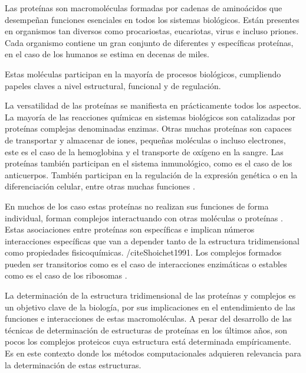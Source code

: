 Las proteínas son macromoléculas formadas por cadenas de aminoácidos que desempeñan funciones esenciales en todos los sistemas biológicos. Están presentes en organismos tan diversos como procariostas, eucariotas, virus e incluso priones. Cada organismo contiene un gran conjunto de diferentes y específicas proteínas, en el caso de los humanos se estima en decenas de miles.\cite{Cozzone2010}

Estas moléculas participan en la mayoría de procesos biológicos, cumpliendo papeles claves a nivel estructural, funcional y de regulación. \cite{Ritchie2008}

La versatilidad de las proteínas se manifiesta en prácticamente todos los aspectos. La mayoría de las reacciones químicas en sistemas biológicos son catalizadas por proteínas complejas denominadas enzimas. Otras muchas proteínas son capaces de transportar y almacenar de iones, pequeñas moléculas o incluso electrones, este es el caso de la hemoglobina y el transporte de oxígeno en la sangre. Las proteínas también participan en el sistema inmunológico, como es el caso de los anticuerpos. También participan en la regulación de la expresión genética o en la diferenciación celular, entre otras muchas funciones \cite{Cozzone2010} \cite{Ritchie2008}.


En muchos de los caso estas proteínas no realizan sus funciones de forma individual, forman complejos interactuando con otras moléculas o proteínas \cite{Ritchie2008}. Estas asociaciones entre proteínas son específicas e implican números interacciones específicas que van a depender tanto de la estructura tridimensional como propiedades fisicoquímicas. /cite{Shoichet1991}. Los complejos formados pueden ser transitorios como es el caso de interacciones enzimáticas o estables como es el caso de los ribosomas \cite{Cozzone2010}.





La determinación de la estructura tridimensional de las proteínas y complejos es un objetivo clave de la biología, por sus implicaciones
en el entendimiento de las funciones e interacciones de estas macromoléculas. 
A pesar del desarrollo de las técnicas de determinación de estructuras de proteínas en los últimos años, son pocos los complejos
proteicos cuya estructura está determinada empíricamente. Es en este contexto donde los métodos computacionales
adquieren relevancia para la determinación de estas estructuras.

